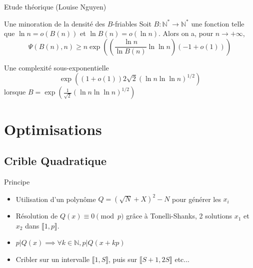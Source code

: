\documentclass{beamer}
\begin{document}
\begin{frame}{Etude théorique (Louise Nguyen)}
    \begin{block}{Une minoration de la densité des $B$-friables}
    Soit $B : \mathbb N^\ast \to \mathbb N^\ast$ une fonction telle que $\ln n = o(B(n))$ et $\ln B(n) = o (\ln n)$. Alors on a, pour $n \to +\infty$,
    \[
    \Psi(B(n), n) \ge n\exp\left(\left(\frac {\ln n}{\ln B(n)} \ln \ln n\right)(-1 + o(1))\right)
    \]
    \end{block}
    \begin{block}{Une complexité sous-exponentielle}
    \[
    \exp\left((1+ o(1))2{\sqrt 2} (\ln n \ln \ln n)^{1/2}\right)
    \]
    lorsque $B =\exp\left(\frac 1{\sqrt 2}(\ln n\ln \ln n)^{1/2}\right)$
    \end{block}
\end{frame}

\section{Optimisations}
\subsection{Crible Quadratique}

\begin{frame}{Principe}
    \begin{itemize}[<+->]
        \item Utilisation d'un polynôme $Q = (\sqrt N + X)^2 - N$ pour générer les $x_i$
        \item Résolution de $Q(x) \equiv 0 \pmod p$ grâce à Tonelli-Shanks, 2 solutions $x_1$ et $x_2$ dans $\llbracket 1, p \rrbracket$.
        \item $p|Q(x) \implies \forall k\in \mathbb N,  p|Q(x+kp)$
        \item Cribler sur un intervalle $\llbracket 1,S \rrbracket$, puis sur $\llbracket S+1,2S \rrbracket$ etc...
    \end{itemize}
\end{frame}


\end{document}
